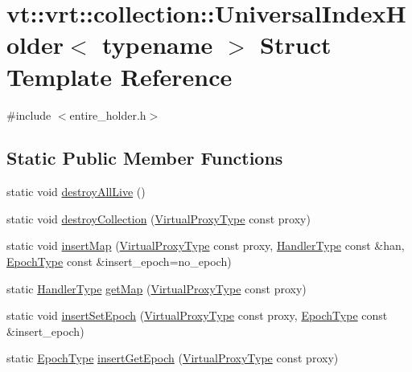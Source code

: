 \hypertarget{structvt_1_1vrt_1_1collection_1_1_universal_index_holder}{}\section{vt\+:\+:vrt\+:\+:collection\+:\+:Universal\+Index\+Holder$<$ typename $>$ Struct Template Reference}
\label{structvt_1_1vrt_1_1collection_1_1_universal_index_holder}


{\ttfamily \#include $<$entire\+\_\+holder.\+h$>$}

\subsection*{Static Public Member Functions}
\begin{DoxyCompactItemize}
\item 
static void \hyperlink{structvt_1_1vrt_1_1collection_1_1_universal_index_holder_a4403caeab7e7cc22ec0bfcf18c212e1e}{destroy\+All\+Live} ()
\item 
static void \hyperlink{structvt_1_1vrt_1_1collection_1_1_universal_index_holder_aca1584759cadbda74eb8c499c73a63e3}{destroy\+Collection} (\hyperlink{namespacevt_a1b417dd5d684f045bb58a0ede70045ac}{Virtual\+Proxy\+Type} const proxy)
\item 
static void \hyperlink{structvt_1_1vrt_1_1collection_1_1_universal_index_holder_a6da9bb8383de73588d8b8379dcab22e4}{insert\+Map} (\hyperlink{namespacevt_a1b417dd5d684f045bb58a0ede70045ac}{Virtual\+Proxy\+Type} const proxy, \hyperlink{namespacevt_af64846b57dfcaf104da3ef6967917573}{Handler\+Type} const \&han, \hyperlink{namespacevt_a985a5adf291c34a3ca263b3378388236}{Epoch\+Type} const \&insert\+\_\+epoch=no\+\_\+epoch)
\item 
static \hyperlink{namespacevt_af64846b57dfcaf104da3ef6967917573}{Handler\+Type} \hyperlink{structvt_1_1vrt_1_1collection_1_1_universal_index_holder_aeff5de464c1477e78b8049a7fbec1046}{get\+Map} (\hyperlink{namespacevt_a1b417dd5d684f045bb58a0ede70045ac}{Virtual\+Proxy\+Type} const proxy)
\item 
static void \hyperlink{structvt_1_1vrt_1_1collection_1_1_universal_index_holder_a8193db85d822ff2783925ef2a5ac3b17}{insert\+Set\+Epoch} (\hyperlink{namespacevt_a1b417dd5d684f045bb58a0ede70045ac}{Virtual\+Proxy\+Type} const proxy, \hyperlink{namespacevt_a985a5adf291c34a3ca263b3378388236}{Epoch\+Type} const \&insert\+\_\+epoch)
\item 
static \hyperlink{namespacevt_a985a5adf291c34a3ca263b3378388236}{Epoch\+Type} \hyperlink{structvt_1_1vrt_1_1collection_1_1_universal_index_holder_a45b646ebb0be1787d3893f4e719ed031}{insert\+Get\+Epoch} (\hyperlink{namespacevt_a1b417dd5d684f045bb58a0ede70045ac}{Virtual\+Proxy\+Type} const proxy)
\end{DoxyCompactItemize}
